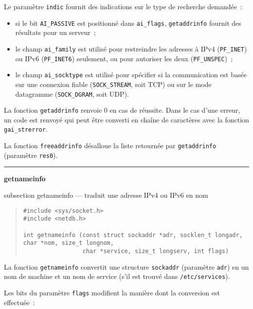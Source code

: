 \documentclass [twoside] {report}
\newcommand {\primitive} [1]
    {
	{\large \bf #1}
	\addcontentsline {toc} {subsection} {#1}
    }
\newcommand {\separation}
    {
	\vspace {7mm}
	\nopagebreak
	\hrule
    }
\begin{document}
Le paramètre \texttt {indic} fournit des indications sur le type 
de recherche demandée~:

\begin {itemize}
    \item si le bit \texttt {AI\_PASSIVE} est positionné dans \texttt
	{ai\_flags}, \texttt {getaddrinfo} fournit des résultats pour
	un serveur~;

    \item le champ \texttt {ai\_family} est utilisé pour restreindre
	les adresses à IPv4 (\texttt {PF\_INET}) ou IPv6 (\texttt
	{PF\_INET6}) seulement, ou pour autoriser les deux (\texttt
	{PF\_UNSPEC})~;

    \item le champ \texttt {ai\_socktype} est utilisé pour spécifier
	si la communication est basée sur une connexion fiable
	(\texttt {SOCK\_STREAM}, soit TCP) ou sur le mode datagramme
	(\texttt {SOCK\_DGRAM}, soit UDP).

\end {itemize}

La fonction \texttt {getaddrinfo} renvoie 0 en cas de réussite.
Dans le cas d'une erreur, un code est renvoyé qui peut être converti
en chaîne de caractères avec la fonction \texttt {gai\_strerror}.

La fonction {\tt freeaddrinfo} désalloue la liste retournée par
\texttt {getaddrinfo} (paramètre \texttt {res0}).


\separation
\primitive {getnameinfo} --- traduit une adresse IPv4 ou IPv6 en nom

\begin {quote}
\begin {verbatim}
#include <sys/socket.h>
#include <netdb.h>

int getnameinfo (const struct sockaddr *adr, socklen_t longadr, char *nom, size_t longnom,
                 char *service, size_t longserv, int flags)
\end{verbatim}
\end {quote}

La fonction \texttt {getnameinfo} convertit une structure \texttt
{sockaddr} (paramètre \texttt {adr}) en un nom de machine et un nom
de service (s'il est trouvé dans \texttt {/etc/services}).

Les bits du paramètre \texttt {flags} modifient la manière dont la
conversion est effectuée~:
\end{document}
